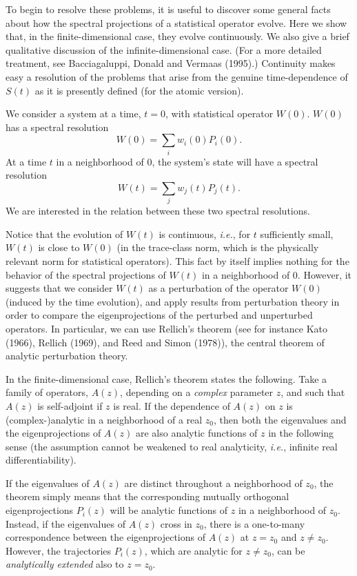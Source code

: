 \documentclass[12pt]{article}
\newcommand{\be}{\begin{equation}}
\newcommand{\ee}{\end{equation}}
\newcommand{\ie}{{\it i.e.}}         %
\begin{document}
To begin to resolve these problems, it is useful to discover some
general facts about how the spectral projections of a statistical
operator evolve.  Here we show that, in the finite-dimensional case,
they evolve continuously.  We also give a brief qualitative discussion
of the infinite-dimensional case.  (For a more detailed treatment, see
Bacciagaluppi, Donald and Vermaas (1995).) Continuity makes easy a
resolution of the problems that arise from the genuine time-dependence
of $S(t)$ as it is presently defined (for the atomic version).

We consider a system at a time, $t=0$, with statistical operator
$W(0)$.  $W(0)$ has a spectral resolution
\be
\label{eq:spectral1}
W(0)=\sum_iw_i(0)P_i(0).
\ee
At a time $t$ in a neighborhood of $0$, the system's state will have a
spectral resolution
\be
\label{eq:spectral2}
W(t)=\sum_jw_j(t)P_j(t).
\ee
\noindent We are interested in the relation between these two spectral
resolutions.

Notice that the evolution of $W(t)$ is continuous, \ie, for $t$ 
sufficiently small, $W(t)$ is close to $W(0)$ (in the trace-class 
norm, which is the physically relevant norm for statistical 
operators).  This fact by itself implies nothing for the behavior of 
the spectral projections of $W(t)$ in a neighborhood of $0$.  However, 
it suggests that we consider $W(t)$ as a perturbation of the operator 
$W(0)$ (induced by the time evolution), and apply results from 
perturbation theory in order to compare the eigenprojections of the 
perturbed and unperturbed operators.  In particular, we can use 
Rellich's theorem (see for instance Kato (1966), Rellich (1969), and 
Reed and Simon (1978)), the central theorem of analytic perturbation 
theory.

In the finite-dimensional case, Rellich's theorem states the 
following.  Take a family of operators, $A(z)$, depending on a {\em 
complex} parameter $z$, and such that $A(z)$ is self-adjoint if $z$ is 
real.  If the dependence of $A(z)$ on $z$ is (complex-)analytic in a 
neighborhood of a real $z_0$, then both the eigenvalues and the 
eigenprojections of $A(z)$ are also analytic functions of $z$ in the 
following sense (the assumption cannot be weakened to real 
analyticity, \ie, infinite real differentiability).

If the eigenvalues of $A(z)$ are distinct throughout a neighborhood of
$z_0$, the theorem simply means that the corresponding mutually
orthogonal eigenprojections $P_i(z)$ will be analytic functions of $z$
in a neighborhood of $z_0$.  Instead, if the eigenvalues of $A(z)$
cross in $z_0$, there is a one-to-many correspondence between the
eigenprojections of $A(z)$ at $z = z_0$ and $z\neq z_0$.  However, the
trajectories $P_i(z)$, which are analytic for $z\neq z_0$, can be {\em
analytically extended} also to $z = z_0$.
\end{document}
